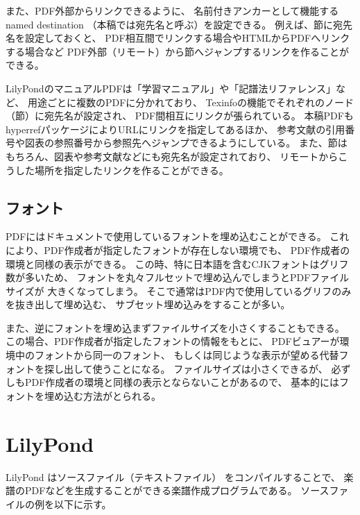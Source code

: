 \documentclass[twocolumn,jafontscale=0.962216,jlreq_notes]{jlreq}
\begin{document}
また、PDF外部からリンクできるように、
名前付きアンカーとして機能するnamed destination
（本稿では宛先名と呼ぶ）を設定できる。
例えば、節に宛先名を設定しておくと、
PDF相互間でリンクする場合やHTMLからPDFへリンクする場合など
PDF外部（リモート）から節へジャンプするリンクを作ることができる。

LilyPondのマニュアルPDFは「学習マニュアル」や「記譜法リファレンス」など、
用途ごとに複数のPDFに分かれており、
Texinfoの機能でそれぞれのノード（節）に宛先名が設定され、
PDF間相互にリンクが張られている。
本稿PDFもhyperrefパッケージによりURLにリンクを指定してあるほか、
参考文献の引用番号や図表の参照番号から参照先へジャンプできるようにしている。
また、節はもちろん、図表や参考文献などにも宛先名が設定されており、
リモートからこうした場所を指定したリンクを作ることができる。

\subsection{フォント}

PDFにはドキュメントで使用しているフォントを埋め込むことができる。
これにより、PDF作成者が指定したフォントが存在しない環境でも、
PDF作成者の環境と同様の表示ができる。
この時、特に日本語を含むCJKフォントはグリフ数が多いため、
フォントを丸々フルセットで埋め込んでしまうとPDFファイルサイズが
大きくなってしまう。
そこで通常はPDF内で使用しているグリフのみを抜き出して埋め込む、
サブセット埋め込みをすることが多い。

また、逆にフォントを埋め込まずファイルサイズを小さくすることもできる。
この場合、PDF作成者が指定したフォントの情報をもとに、
PDFビュアーが環境中のフォントから同一のフォント、
もしくは同じような表示が望める代替フォントを探し出して使うことになる。
ファイルサイズは小さくできるが、
必ずしもPDF作成者の環境と同様の表示とならないことがあるので、
基本的にはフォントを埋め込む方法がとられる。

\section{LilyPond}

LilyPond \cite{lilypond}はソースファイル（テキストファイル）
をコンパイルすることで、
楽譜のPDFなどを生成することができる楽譜作成プログラムである。
ソースファイルの例を以下に示す。

\begin{center}
\tcbox[left=0mm,right=0mm,top=0mm,bottom=0mm]%
      {}
\end{center}
\end{document}
